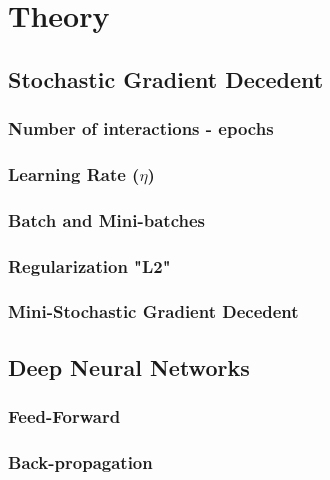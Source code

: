 \section{Theory}
\label{chap:Theory}


\subsection{Stochastic Gradient Decedent}
\label{chap:Stochastic Gradient Decedent}

\subsubsection{Number of interactions - epochs}
\label{chap:Number of interactions - epochs}

\subsubsection{Learning Rate ($\eta$)}
\label{chap:Learning Rate}

\subsubsection{Batch and Mini-batches}
\label{chap:Batch and Mini-batches}

\subsubsection{Regularization "L2"}
\label{chap:Regularization "L2"}

\subsubsection{Mini-Stochastic Gradient Decedent}
\label{chap:Mini-Stochastic Gradient Decedent}


\subsection{Deep Neural Networks}
\label{chap:Deep Neural Networks}

\subsubsection{Feed-Forward}
\label{chap:Feed-Forward}

\subsubsection{Back-propagation}
\label{chap:Back-propagation}


